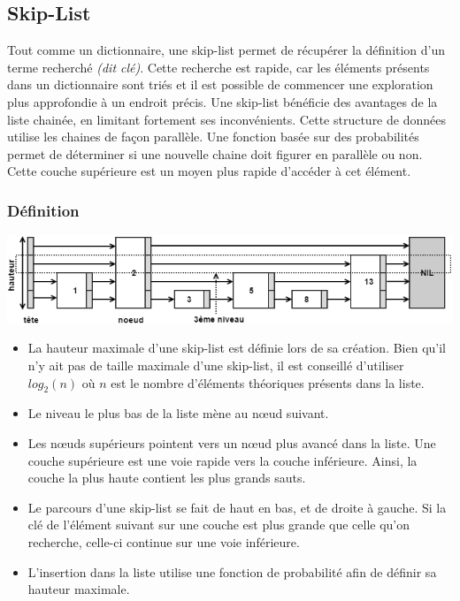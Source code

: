 \documentclass[hidelinks,a4paper, 12pt]{article}
\begin{document}
	
	
	\newpage
	\subsection{Skip-List}
	Tout comme un dictionnaire, une skip-list permet de récupérer la définition d'un terme recherché \textit{(dit clé)}. Cette recherche est rapide, car les éléments présents dans un dictionnaire sont triés et il est possible de commencer une exploration plus approfondie à un endroit précis.
	 Une skip-list bénéficie des avantages de la liste chainée, en limitant fortement ses inconvénients. Cette structure de données utilise les chaines de façon parallèle. Une fonction basée sur des probabilités permet de déterminer si une nouvelle chaine doit figurer en parallèle ou non. Cette couche supérieure est un moyen plus rapide d'accéder à cet élément.
	\subsubsection*{Définition}
	
	\begin{center}
		\includegraphics[width=\textwidth]{img/struct} %
	\end{center}
	
	\begin{itemize}
		\item La hauteur maximale d'une skip-list est définie lors de sa création. Bien qu'il n'y ait pas de taille maximale d'une skip-list, il est conseillé d'utiliser $log_2(n)$ où $n$ est le nombre d'éléments théoriques présents dans la liste. 
		\item Le niveau le plus bas de la liste mène au nœud suivant. %
		\item Les nœuds supérieurs pointent vers un nœud plus avancé dans la liste.  Une couche supérieure est une voie rapide vers la couche inférieure. Ainsi, la couche la plus haute contient les plus grands sauts.
		\item Le parcours d'une skip-list se fait de haut en bas, et de droite à gauche. Si la clé de l'élément suivant sur une couche est plus grande que celle qu'on recherche, celle-ci continue sur une voie inférieure.
		\item L'insertion dans la liste utilise une fonction de probabilité afin de définir sa hauteur maximale.
	\end{itemize}
	
\end{document}
